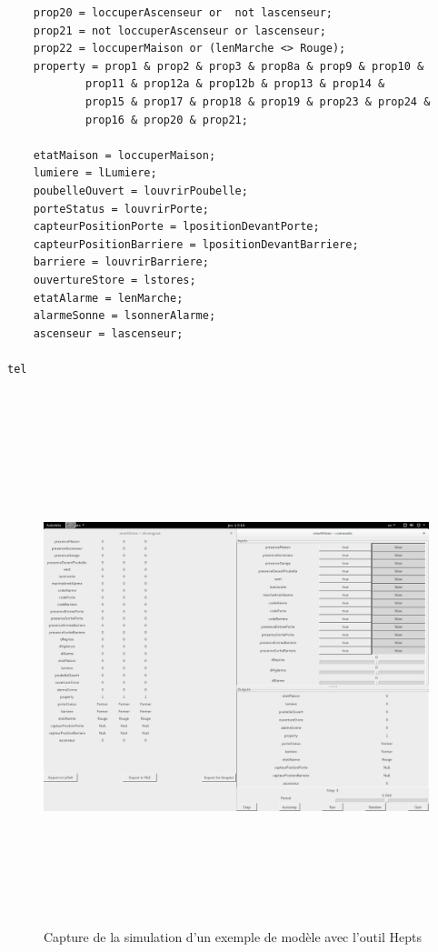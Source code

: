 \documentclass{svjour3}
\begin{document}
\begin{lstlisting}
	prop20 = loccuperAscenseur or  not lascenseur;
	prop21 = not loccuperAscenseur or lascenseur;
	prop22 = loccuperMaison or (lenMarche <> Rouge);
	property = prop1 & prop2 & prop3 & prop8a & prop9 & prop10 &
		    prop11 & prop12a & prop12b & prop13 & prop14 & 
		    prop15 & prop17 & prop18 & prop19 & prop23 & prop24 & 
		    prop16 & prop20 & prop21;

	etatMaison = loccuperMaison;
	lumiere = lLumiere;
	poubelleOuvert = louvrirPoubelle;
	porteStatus = louvrirPorte;
	capteurPositionPorte = lpositionDevantPorte;
	capteurPositionBarriere = lpositionDevantBarriere;
	barriere = louvrirBarriere;
	ouvertureStore = lstores;
	etatAlarme = lenMarche;
	alarmeSonne = lsonnerAlarme;
	ascenseur = lascenseur;
	
tel
 
\end{lstlisting}

\begin{figure}[!h]
 \includegraphics[height=15cm, width=15cm]{simulation.png}
 \caption{Capture de la simulation d'un exemple de modèle avec l'outil Hepts}
 \label{schemaSimilation}
\end{figure}
\end{document}
